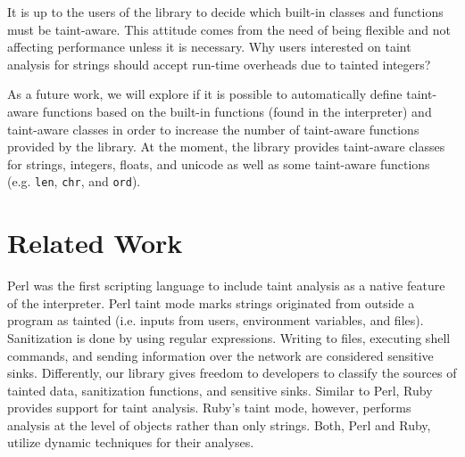 \documentclass[oribibl]{llncs}
\newcommand{\nametklass}{taint-aware }
\newcommand{\namefunc}{taint-aware }
\begin{document}
It is up to the users of the library 
to decide which built-in classes and functions must be
taint-aware. This attitude comes from the need of being flexible 
and not affecting performance unless it is necessary. 
Why users interested on 
taint analysis for strings should accept 
run-time overheads due to tainted integers? 

As a future work, we will explore if 
it is possible to automatically 
define \namefunc functions 
based on the built-in functions (found in the 
interpreter) and \nametklass classes in order to 
increase the number of \nametklass functions provided by the library.
At the moment, the library provides 
\nametklass classes for
strings, integers, floats, and unicode as well as some 
\namefunc functions (e.g. \texttt{len}, \texttt{chr}, 
and \texttt{ord}). 

\section{Related Work}
\label{sec:related}

Perl \cite{Perl} was the first scripting language to include taint analysis
as a native feature of the interpreter. Perl taint mode marks strings
originated from outside a program as tainted (i.e. 
inputs from users, environment variables, and files). Sanitization
is done by using regular expressions. Writing to files, 
executing shell commands, and sending information over the network are
considered sensitive sinks. Differently, 
our library gives freedom to developers 
to classify the sources of 
tainted data, sanitization functions, and sensitive sinks. 
Similar to Perl, Ruby \cite{thomas2004prub} provides 
support for taint analysis. Ruby's taint mode, however, 
performs analysis at the level of
objects rather than only strings. Both, Perl and Ruby, utilize dynamic
techniques for their analyses.
\end{document}
